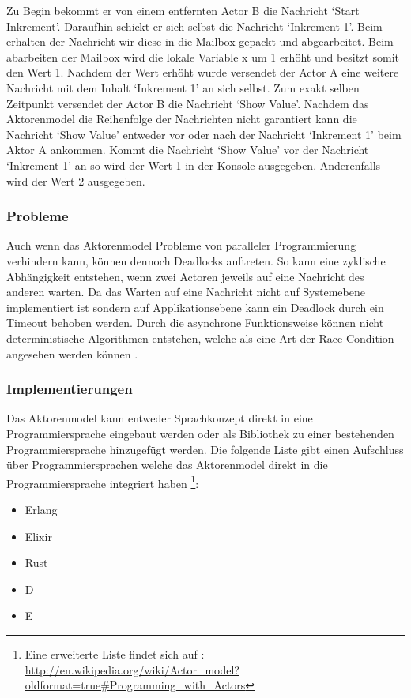 Zu Begin bekommt er von einem entfernten Actor B die Nachricht `Start Inkrement'. Daraufhin schickt er sich selbst die Nachricht `Inkrement 1'. Beim erhalten der Nachricht wir diese in die Mailbox gepackt und abgearbeitet. Beim abarbeiten der Mailbox wird die lokale Variable x um 1 erhöht und besitzt somit den Wert 1. Nachdem der Wert erhöht wurde versendet der Actor A eine weitere Nachricht mit dem Inhalt `Inkrement 1' an sich selbst. Zum exakt selben Zeitpunkt versendet der Actor B die Nachricht `Show Value'. Nachdem das Aktorenmodel  die Reihenfolge der Nachrichten nicht garantiert kann die Nachricht `Show Value' entweder vor oder nach der Nachricht `Inkrement 1' beim Aktor A ankommen. Kommt die Nachricht `Show Value' vor der Nachricht `Inkrement 1' an so wird der Wert 1 in der Konsole ausgegeben. Anderenfalls wird der Wert 2 ausgegeben.

\subsubsection{Probleme}
Auch wenn das Aktorenmodel Probleme von paralleler Programmierung verhindern kann, können dennoch Deadlocks auftreten. So kann eine zyklische Abhängigkeit entstehen, wenn zwei Actoren jeweils auf eine Nachricht des anderen warten. Da das Warten auf eine Nachricht nicht auf Systemebene implementiert ist sondern auf Applikationsebene kann ein Deadlock durch ein Timeout behoben werden. Durch die asynchrone Funktionsweise können nicht deterministische Algorithmen entstehen, welche als eine Art der Race Condition angesehen werden können \cite[p. 86]{Erb2012}. 

\subsubsection{Implementierungen}
Das Aktorenmodel kann entweder Sprachkonzept direkt in eine Programmiersprache eingebaut werden oder als Bibliothek zu einer bestehenden Programmiersprache hinzugefügt werden. Die folgende Liste gibt einen Aufschluss über Programmiersprachen welche das Aktorenmodel direkt in die Programmiersprache integriert haben \footnote{Eine erweiterte Liste findet sich auf  \cite[p. 86]{Erb2012}: \url{http://en.wikipedia.org/wiki/Actor_model?oldformat=true#Programming_with_Actors}}:

\begin{itemize}
  \item Erlang
  \item Elixir
  \item Rust
  \item D
  \item E
\end{itemize}

